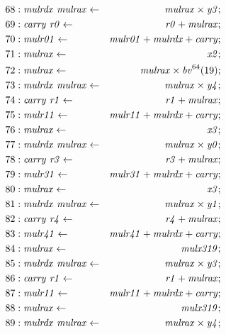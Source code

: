 {\begin{align*}
68 &: \mathit{mulrdx}\ \mathit{mulrax} \leftarrow & \mathit{mulrax} \times \mathit{y3}; \\
69 &: \mathit{carry}\ \mathit{r0} \leftarrow & \mathit{r0} + \mathit{mulrax}; \\
70 &: \mathit{mulr01} \leftarrow & \mathit{mulr01} + \mathit{mulrdx} + \mathit{carry}; \\
71 &: \mathit{mulrax} \leftarrow & \mathit{x2}; \\
72 &: \mathit{mulrax} \leftarrow & \mathit{mulrax} \times \bv^{64}(19); \\
73 &: \mathit{mulrdx}\ \mathit{mulrax} \leftarrow & \mathit{mulrax} \times \mathit{y4}; \\
74 &: \mathit{carry}\ \mathit{r1} \leftarrow & \mathit{r1} + \mathit{mulrax}; \\
75 &: \mathit{mulr11} \leftarrow & \mathit{mulr11} + \mathit{mulrdx} + \mathit{carry}; \\
76 &: \mathit{mulrax} \leftarrow & \mathit{x3}; \\
77 &: \mathit{mulrdx}\ \mathit{mulrax} \leftarrow & \mathit{mulrax} \times \mathit{y0}; \\
78 &: \mathit{carry}\ \mathit{r3} \leftarrow & \mathit{r3} + \mathit{mulrax}; \\
79 &: \mathit{mulr31} \leftarrow & \mathit{mulr31} + \mathit{mulrdx} + \mathit{carry}; \\
80 &: \mathit{mulrax} \leftarrow & \mathit{x3}; \\
81 &: \mathit{mulrdx}\ \mathit{mulrax} \leftarrow & \mathit{mulrax} \times \mathit{y1}; \\
82 &: \mathit{carry}\ \mathit{r4} \leftarrow & \mathit{r4} + \mathit{mulrax}; \\
83 &: \mathit{mulr41} \leftarrow & \mathit{mulr41} + \mathit{mulrdx} + \mathit{carry}; \\
84 &: \mathit{mulrax} \leftarrow & \mathit{mulx319}; \\
85 &: \mathit{mulrdx}\ \mathit{mulrax} \leftarrow & \mathit{mulrax} \times \mathit{y3}; \\
86 &: \mathit{carry}\ \mathit{r1} \leftarrow & \mathit{r1} + \mathit{mulrax}; \\
87 &: \mathit{mulr11} \leftarrow & \mathit{mulr11} + \mathit{mulrdx} + \mathit{carry}; \\
88 &: \mathit{mulrax} \leftarrow & \mathit{mulx319}; \\
89 &: \mathit{mulrdx}\ \mathit{mulrax} \leftarrow & \mathit{mulrax} \times \mathit{y4}; \\

\end{align*}}
